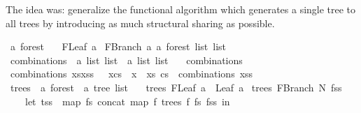 \begin{isabellebody}
\begin{isamarkuptext}
The idea was: generalize the functional algorithm which generates a single tree to all trees
by introducing as much structural sharing as possible.%
\end{isamarkuptext}\isamarkuptrue%
\isamarkupfalse%
\ {\isacharprime}{\kern0pt}a\ forest\ {\isacharequal}{\kern0pt}\isanewline
\ \ FLeaf\ {\isacharprime}{\kern0pt}a\isanewline
{\isacharbar}{\kern0pt}\ FBranch\ {\isacharprime}{\kern0pt}a\ {\isachardoublequoteopen}{\isacharprime}{\kern0pt}a\ forest\ list\ list{\isachardoublequoteclose}\isanewline
\isanewline
{}\isamarkupfalse%
\ combinations\ {\isacharcolon}{\kern0pt}{\isacharcolon}{\kern0pt}\ {\isachardoublequoteopen}{\isacharprime}{\kern0pt}a\ list\ list\ {\isasymRightarrow}\ {\isacharprime}{\kern0pt}a\ list\ list{\isachardoublequoteclose}\ \isanewline
\ \ {\isachardoublequoteopen}combinations\ {\isacharbrackleft}{\kern0pt}{\isacharbrackright}{\kern0pt}\ {\isacharequal}{\kern0pt}\ {\isacharbrackleft}{\kern0pt}{\isacharbrackleft}{\kern0pt}{\isacharbrackright}{\kern0pt}{\isacharbrackright}{\kern0pt}{\isachardoublequoteclose}\isanewline
{\isacharbar}{\kern0pt}\ {\isachardoublequoteopen}combinations\ {\isacharparenleft}{\kern0pt}xs{\isacharhash}{\kern0pt}xss{\isacharparenright}{\kern0pt}\ {\isacharequal}{\kern0pt}\ {\isacharbrackleft}{\kern0pt}\ x{\isacharhash}{\kern0pt}cs\ {\isachardot}{\kern0pt}\ x\ {\isacharless}{\kern0pt}{\isacharminus}{\kern0pt}\ xs{\isacharcomma}{\kern0pt}\ cs\ {\isacharless}{\kern0pt}{\isacharminus}{\kern0pt}\ combinations\ xss\ {\isacharbrackright}{\kern0pt}{\isachardoublequoteclose}\isanewline
\isanewline
{}\isamarkupfalse%
\ trees\ {\isacharcolon}{\kern0pt}{\isacharcolon}{\kern0pt}\ {\isachardoublequoteopen}{\isacharprime}{\kern0pt}a\ forest\ {\isasymRightarrow}\ {\isacharprime}{\kern0pt}a\ tree\ list{\isachardoublequoteclose}\ \isanewline
\ \ {\isachardoublequoteopen}trees\ {\isacharparenleft}{\kern0pt}FLeaf\ a{\isacharparenright}{\kern0pt}\ {\isacharequal}{\kern0pt}\ {\isacharbrackleft}{\kern0pt}Leaf\ a{\isacharbrackright}{\kern0pt}{\isachardoublequoteclose}\isanewline
{\isacharbar}{\kern0pt}\ {\isachardoublequoteopen}trees\ {\isacharparenleft}{\kern0pt}FBranch\ N\ fss{\isacharparenright}{\kern0pt}\ {\isacharequal}{\kern0pt}\ {\isacharparenleft}{\kern0pt}\isanewline
\ \ \ \ let\ tss\ {\isacharequal}{\kern0pt}\ {\isacharparenleft}{\kern0pt}map\ {\isacharparenleft}{\kern0pt}{\isasymlambda}fs{\isachardot}{\kern0pt}\ concat\ {\isacharparenleft}{\kern0pt}map\ {\isacharparenleft}{\kern0pt}{\isasymlambda}f{\isachardot}{\kern0pt}\ trees\ f{\isacharparenright}{\kern0pt}\ fs{\isacharparenright}{\kern0pt}{\isacharparenright}{\kern0pt}\ fss{\isacharparenright}{\kern0pt}\ in\isanewline

\end{isabellebody}
